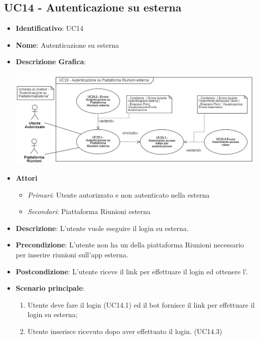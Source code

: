 \subsection{UC14 - Autenticazione su  esterna}
\begin{itemize}
	\item \textbf{Identificativo}: UC14
	\item \textbf{Nome}: Autenticazione su  esterna
	\item\textbf{Descrizione Grafica}: 
	\begin{center}
		\includegraphics[scale=0.65]{images/UC14.png} 
	\end{center}

	\item \textbf{Attori}
	\begin{itemize} 
		\item \textit{Primari}: Utente autorizzato e non autenticato nella  esterna
		\item \textit{Secondari}: Piattaforma Riunioni esterna
	\end{itemize}
	\item \textbf{Descrizione}: L'utente vuole eseguire il login su  esterna.
	\item \textbf{Precondizione}: L'utente non ha un  della piattaforma Riunioni necessario per inserire riunioni sull'app esterna.
	\item \textbf{Postcondizione}: L'utente riceve il link per effettuare il login ed ottenere l'.
	\item \textbf{Scenario principale}: \begin{enumerate}
		\item Utente deve fare il login (UC14.1) ed il bot fornisce il link per effettuare il login su  esterna; 
		\item Utente inserisce  ricevuto dopo aver effettuato il login. (UC14.3)
	\end{enumerate}
\end{itemize}

